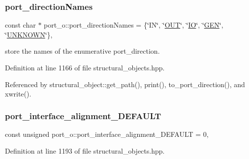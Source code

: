 \subsubsection{\texorpdfstring{port\+\_\+direction\+Names}{port\_directionNames}}
{\footnotesize\ttfamily const char $\ast$ port\+\_\+o\+::port\+\_\+direction\+Names = \{\char`\"{}IN\char`\"{}, \char`\"{}\hyperlink{structport__o_adb254df5665ff28b0769491cc3899fd5ab3bfd4c2f6c68477c8c78a747e879f18}{O\+UT}\char`\"{}, \char`\"{}\hyperlink{structport__o_adb254df5665ff28b0769491cc3899fd5a1a30314caccd0c640b1703a56df5712a}{IO}\char`\"{}, \char`\"{}\hyperlink{structport__o_adb254df5665ff28b0769491cc3899fd5a1269ba4a4593962d3d6f4665e2d44f9b}{G\+EN}\char`\"{}, \char`\"{}\hyperlink{structport__o_adb254df5665ff28b0769491cc3899fd5a98736d3313a3503c8c11633bef7fd192}{U\+N\+K\+N\+O\+WN}\char`\"{}\}\hspace{0.3cm}{\ttfamily [static]}, {\ttfamily [private]}}



store the names of the enumerative port\+\_\+direction. 



Definition at line 1166 of file structural\+\_\+objects.\+hpp.



Referenced by structural\+\_\+object\+::get\+\_\+path(), print(), to\+\_\+port\+\_\+direction(), and xwrite().

\mbox{\label{structport__o_ab4b79782a585643db93e33d3b7dbac73}} 
\subsubsection{\texorpdfstring{port\+\_\+interface\+\_\+alignment\+\_\+\+D\+E\+F\+A\+U\+LT}{port\_interface\_alignment\_DEFAULT}}
{\footnotesize\ttfamily const unsigned port\+\_\+o\+::port\+\_\+interface\+\_\+alignment\+\_\+\+D\+E\+F\+A\+U\+LT = 0\hspace{0.3cm}{\ttfamily [static]}, {\ttfamily [private]}}



Definition at line 1193 of file structural\+\_\+objects.\+hpp.



